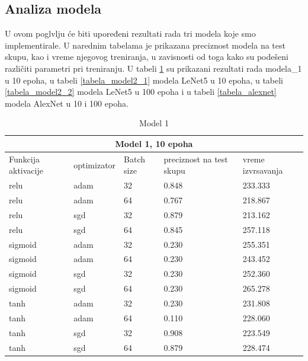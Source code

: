 \documentclass[a4paper]{article}
\begin{document}
\newpage


\subsection{Analiza modela}
\label{sec:analiza_modela}

U ovom poglvlju će biti upoređeni rezultati rada tri modela koje smo implementirale. U narednim tabelama je prikazana preciznost modela na test skupu, kao i vreme njegovog treniranja, u zavisnosti od toga kako su podešeni različiti parametri pri treniranju. U tabeli \ref{tabela_model1} su prikazani rezultati rada modela\_1 u 10 epoha, u tabeli \ref{tabela_model2_1} modela LeNet5 u 10 epoha, u tabeli \ref{tabela_model2_2} modela LeNet5 u 100 epoha i u tabeli \ref{tabela_alexnet} modela AlexNet u 10 i 100 epoha.


\begin{table}[h!]
\begin{center}
\caption{Model 1}
\begin{tabular}{ |p{1.5cm}||p{2cm}|p{1cm}|p{1.5cm}|p{1.5cm}| }
 \hline
 \multicolumn{5}{|c|}{Model 1,  10 epoha} \\
 \hline
 Funkcija aktivacije & optimizator & Batch size & preciznost na test skupu & vreme izvrsavanja\\
 \hline
 relu    & adam & 32  & 0.848  & 233.333 \\
 relu    & adam & 64  & 0.767  & 218.867 \\
 relu    & sgd  & 32  & 0.879  & 213.162  \\
 relu    & sgd  & 64  & 0.845  & 257.118  \\
 sigmoid & adam & 32  & 0.230  & 255.351  \\
 sigmoid & adam & 64  & 0.230  & 243.452  \\
 sigmoid & sgd  & 32  & 0.230  & 252.360  \\
 sigmoid & sgd  & 64  & 0.230  & 265.278  \\
 tanh    & adam & 32  & 0.230  & 231.808  \\
 tanh    & adam & 64  & 0.110  & 228.060  \\
 tanh    & sgd  & 32  & 0.908  & 223.549  \\
 tanh    & sgd  & 64  & 0.879  & 228.474  \\

 \hline
\end{tabular}
\label{tabela_model1}
\end{center}
\end{table}
\end{document}
